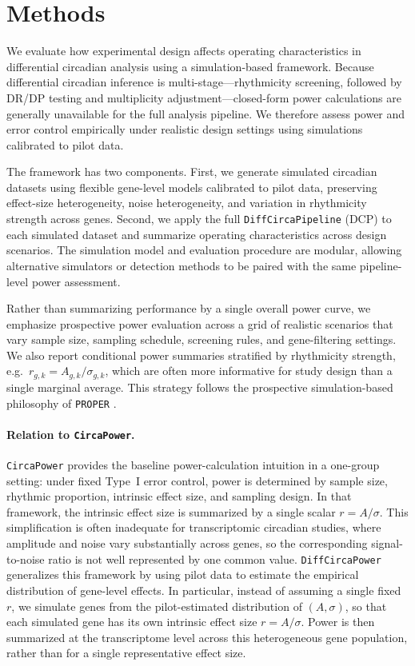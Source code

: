 \documentclass{article}
\newcommand{\software}[1]{\texttt{#1}}
\begin{document}
\section{Methods}

We evaluate how experimental design affects operating characteristics in
differential circadian analysis using a simulation-based framework. Because
differential circadian inference is multi-stage---rhythmicity screening,
followed by DR/DP testing and multiplicity adjustment---closed-form power
calculations are generally unavailable for the full analysis pipeline. We
therefore assess power and error control empirically under realistic design
settings using simulations calibrated to pilot data.

The framework has two components. First, we generate simulated circadian
datasets using flexible gene-level models calibrated to pilot data, preserving
effect-size heterogeneity, noise heterogeneity, and variation in rhythmicity
strength across genes. Second, we apply the full
\software{DiffCircaPipeline} (DCP) to each simulated dataset and summarize
operating characteristics across design scenarios. The simulation model and
evaluation procedure are modular, allowing alternative simulators or detection
methods to be paired with the same pipeline-level power assessment.

Rather than summarizing performance by a single overall power curve, we
emphasize prospective power evaluation across a grid of realistic scenarios
that vary sample size, sampling schedule, screening rules, and gene-filtering
settings. We also report conditional power summaries stratified by rhythmicity
strength, e.g.\ $r_{g,k}=A_{g,k}/\sigma_{g,k}$, which are often more
informative for study design than a single marginal average. This strategy follows
the prospective simulation-based philosophy of \software{PROPER}
\cite{wu2015proper}.

\paragraph{Relation to \software{CircaPower}.}
\software{CircaPower} provides the baseline power-calculation intuition in a
one-group setting: under fixed Type~I error control, power is determined by
sample size, rhythmic proportion, intrinsic effect size, and sampling design.
In that framework, the intrinsic effect size is summarized by a single scalar
$r=A/\sigma$. This simplification is often inadequate for transcriptomic
circadian studies, where amplitude and noise vary substantially across genes,
so the corresponding signal-to-noise ratio is not well represented by one
common value. \software{DiffCircaPower} generalizes this framework by using
pilot data to estimate the empirical distribution of gene-level effects. In
particular, instead of assuming a single fixed $r$, we simulate genes from the
pilot-estimated distribution of $(A,\sigma)$, so that each simulated gene has
its own intrinsic effect size $r=A/\sigma$. Power is then summarized at the
transcriptome level across this heterogeneous gene population, rather than for
a single representative effect size.
\end{document}
